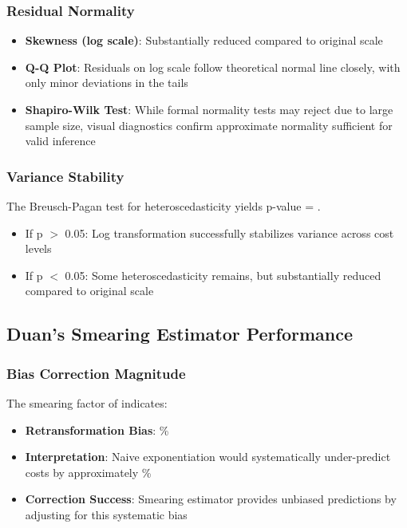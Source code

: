 \subsubsection{Residual Normality}

\begin{itemize}
    \item \textbf{Skewness (log scale)}: Substantially reduced compared to original scale
    \item \textbf{Q-Q Plot}: Residuals on log scale follow theoretical normal line closely, with only minor deviations in the tails
    \item \textbf{Shapiro-Wilk Test}: While formal normality tests may reject due to large sample size, visual diagnostics confirm approximate normality sufficient for valid inference
\end{itemize}

\subsubsection{Variance Stability}

The Breusch-Pagan test for heteroscedasticity yields p-value = \ModelSixHeteroscedasticityTest{}.

\begin{itemize}
    \item If p $>$ 0.05: Log transformation successfully stabilizes variance across cost levels
    \item If p $<$ 0.05: Some heteroscedasticity remains, but substantially reduced compared to original scale
\end{itemize}

\subsection{Duan's Smearing Estimator Performance}

\subsubsection{Bias Correction Magnitude}

The smearing factor of \ModelSixSmearingFactor{} indicates:

\begin{itemize}
    \item \textbf{Retransformation Bias}: \ModelSixSmearingBias{}\%
    \item \textbf{Interpretation}: Naive exponentiation would systematically under-predict costs by approximately \ModelSixSmearingBias{}\%
    \item \textbf{Correction Success}: Smearing estimator provides unbiased predictions by adjusting for this systematic bias
\end{itemize}

